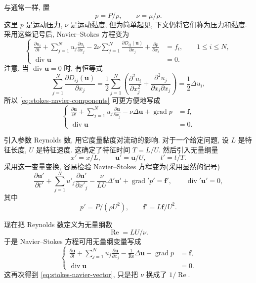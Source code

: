 与通常一样, 置
\begin{equation}\label{eq:stokes-kinematic-pressure-viscosity}
p=P/\rho,\qquad \nu=\mu/\rho.
\end{equation}
这里 $p$ 是运动压力, $\nu$ 是运动黏度, 但为简单起见,
下文仍将它们称为压力和黏度. 采用这些记号后, Navier--Stokes 方程变为
\begin{equation}\label{eq:stokes-navier-components}
\left\{
\begin{aligned}
\frac{\partial u_i}{\partial t}
+\sum_{j=1}^{N}u_j\frac{\partial u_i}{\partial x_j}
-2\nu\sum_{j=1}^{N}\frac{\partial D_{ij}(\mathbf{u})}{\partial x_j}
+\frac{\partial p}{\partial x_i}
&=f_i,\qquad 1\le i\le N,\\
\operatorname{div}\mathbf{u}&=0.
\end{aligned}
\right.
\end{equation}
注意, 当 $\operatorname{div}\mathbf{u}=0$ 时, 有恒等式
\begin{equation}\label{eq:stokes-strain-laplacian-identity}
\sum_{j=1}^{N}\frac{\partial D_{ij}(\mathbf{u})}{\partial x_j}
=\frac12\sum_{j=1}^{N}\left(
\frac{\partial^2u_i}{\partial x_j^2}
+\frac{\partial^2u_j}{\partial x_i\partial x_j}
\right)
=\frac12\Delta u_i,
\end{equation}
所以 \eqref{eq:stokes-navier-components} 可更方便地写成
\begin{equation}\label{eq:stokes-navier-vector}
\left\{
\begin{aligned}
\frac{\partial\mathbf{u}}{\partial t}
+\sum_{j=1}^{N}u_j\frac{\partial\mathbf{u}}{\partial x_j}
-\nu\Delta\mathbf{u}+\operatorname{grad}p&=\mathbf{f},\\
\operatorname{div}\mathbf{u}&=0.
\end{aligned}
\right.
\end{equation}

引入参数 Reynolds 数, 用它度量黏度对流动的影响.
对于一个给定问题, 设 $L$ 是特征长度, $U$ 是特征速度.
这确定了特征时间 $T=L/U$. 然后引入无量纲量
\[
x'=x/L,\qquad \mathbf{u}'=\mathbf{u}/U,\qquad t'=t/T.
\]
采用这一变量变换, 容易检验 Navier--Stokes 方程变为(采用显然的记号)
\[
\frac{\partial\mathbf{u}'}{\partial t'}
+\sum_{j=1}^{N}u'_j\frac{\partial\mathbf{u}'}{\partial x'_j}
-\frac{\nu}{LU}\Delta'\mathbf{u}'
+\operatorname{grad}'p'=\mathbf{f}',
\qquad
\operatorname{div}'\mathbf{u}'=0,
\]
其中
\[
p'=P/(\rho U^2),\qquad \mathbf{f}'=L\mathbf{f}/U^2.
\]

现在把 Reynolds 数定义为无量纲数
\[
\operatorname{Re}=LU/\nu.
\]
于是 Navier--Stokes 方程可用无量纲变量写成
\begin{equation}\label{eq:stokes-navier-dimensionless}
\left\{
\begin{aligned}
\frac{\partial\mathbf{u}}{\partial t}
+\sum_{j=1}^{N}u_j\frac{\partial\mathbf{u}}{\partial x_j}
-\frac1{\operatorname{Re}}\Delta\mathbf{u}
+\operatorname{grad}p&=\mathbf{f},\\
\operatorname{div}\mathbf{u}&=0.
\end{aligned}
\right.
\end{equation}
这再次得到 \eqref{eq:stokes-navier-vector}, 只是把 $\nu$ 换成了
$1/\operatorname{Re}$.

